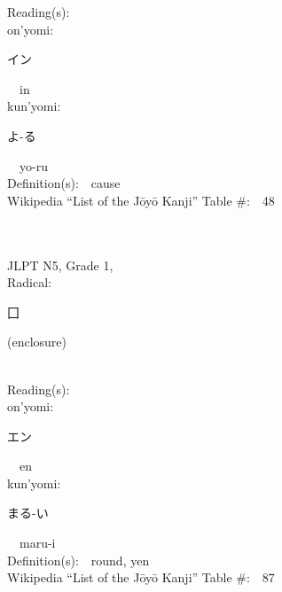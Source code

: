 \begin{multicols}{2}
Reading(s):\ \ \\
{\hspace*{1em}}on'yomi:\ \ \\
{\hspace*{2em}}{\begin{CJK}{UTF8}{min} イン \end{CJK}}\ \ in\ \ \\
{\hspace*{1em}}kun'yomi:\ \ \\
{\hspace*{2em}}{\begin{CJK}{UTF8}{min} よ-る \end{CJK}}\ \ yo-ru\ \ \\
Definition(s):\ \ cause \\
Wikipedia ``List of the J\=oy\=o Kanji'' Table \#:\ \ 48 \\
\ \ \\
{\fontsize{34pt}{40pt}  }\ \ \\  %
{JLPT N5, Grade 1, \\Radical:\ \ {\begin{CJK}{UTF8}{min} 囗 \end{CJK}} (enclosure) } \\
Reading(s):\ \ \\
{\hspace*{1em}}on'yomi:\ \ \\
{\hspace*{2em}}{\begin{CJK}{UTF8}{min} エン \end{CJK}}\ \ en\ \ \\
{\hspace*{1em}}kun'yomi:\ \ \\
{\hspace*{2em}}{\begin{CJK}{UTF8}{min} まる-い \end{CJK}}\ \ maru-i\ \ \\
Definition(s):\ \ round, yen \\
Wikipedia ``List of the J\=oy\=o Kanji'' Table \#:\ \ 87 \\
\ \ \\
{\fontsize{34pt}{40pt}  }\ \ \\  %

\end{multicols}
